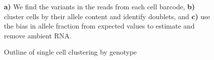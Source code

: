 \begin{figure}[htbp!]
\begin{centering}

\caption{Outline of single cell clustering by genotype}\label{fig:souporcell}
\par{\textbf{a)} We find the variants in the reads from each cell barcode, \textbf{b)} cluster cells by their allele content and identify doublets, and \textbf{c)} use the bias in allele fraction from expected values to estimate and remove ambient RNA.}
\end{centering}
\end{figure}

